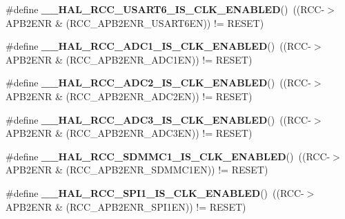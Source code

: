 \begin{DoxyCompactItemize}
\#define {\bfseries \+\_\+\+\_\+\+H\+A\+L\+\_\+\+R\+C\+C\+\_\+\+U\+S\+A\+R\+T6\+\_\+\+I\+S\+\_\+\+C\+L\+K\+\_\+\+E\+N\+A\+B\+L\+ED}()~((R\+CC-\/$>$A\+P\+B2\+E\+NR \& (R\+C\+C\+\_\+\+A\+P\+B2\+E\+N\+R\+\_\+\+U\+S\+A\+R\+T6\+EN)) != R\+E\+S\+ET)
\item 
\mbox{\label{group___r_c_c_ex___peripheral___clock___enable___disable___status_ga66eb89f7d856d9107e814efc751e8996}} 
\#define {\bfseries \+\_\+\+\_\+\+H\+A\+L\+\_\+\+R\+C\+C\+\_\+\+A\+D\+C1\+\_\+\+I\+S\+\_\+\+C\+L\+K\+\_\+\+E\+N\+A\+B\+L\+ED}()~((R\+CC-\/$>$A\+P\+B2\+E\+NR \& (R\+C\+C\+\_\+\+A\+P\+B2\+E\+N\+R\+\_\+\+A\+D\+C1\+EN)) != R\+E\+S\+ET)
\item 
\mbox{\label{group___r_c_c_ex___peripheral___clock___enable___disable___status_ga15b3a60ca51c76fa9da900d5cbcd4234}} 
\#define {\bfseries \+\_\+\+\_\+\+H\+A\+L\+\_\+\+R\+C\+C\+\_\+\+A\+D\+C2\+\_\+\+I\+S\+\_\+\+C\+L\+K\+\_\+\+E\+N\+A\+B\+L\+ED}()~((R\+CC-\/$>$A\+P\+B2\+E\+NR \& (R\+C\+C\+\_\+\+A\+P\+B2\+E\+N\+R\+\_\+\+A\+D\+C2\+EN)) != R\+E\+S\+ET)
\item 
\mbox{\label{group___r_c_c_ex___peripheral___clock___enable___disable___status_ga57679c13a42654a4c1d73fb3ec347d13}} 
\#define {\bfseries \+\_\+\+\_\+\+H\+A\+L\+\_\+\+R\+C\+C\+\_\+\+A\+D\+C3\+\_\+\+I\+S\+\_\+\+C\+L\+K\+\_\+\+E\+N\+A\+B\+L\+ED}()~((R\+CC-\/$>$A\+P\+B2\+E\+NR \& (R\+C\+C\+\_\+\+A\+P\+B2\+E\+N\+R\+\_\+\+A\+D\+C3\+EN)) != R\+E\+S\+ET)
\item 
\mbox{\label{group___r_c_c_ex___peripheral___clock___enable___disable___status_ga146964bf211aad404f4fd87b1a1efd60}} 
\#define {\bfseries \+\_\+\+\_\+\+H\+A\+L\+\_\+\+R\+C\+C\+\_\+\+S\+D\+M\+M\+C1\+\_\+\+I\+S\+\_\+\+C\+L\+K\+\_\+\+E\+N\+A\+B\+L\+ED}()~((R\+CC-\/$>$A\+P\+B2\+E\+NR \& (R\+C\+C\+\_\+\+A\+P\+B2\+E\+N\+R\+\_\+\+S\+D\+M\+M\+C1\+EN)) != R\+E\+S\+ET)
\item 
\mbox{\label{group___r_c_c_ex___peripheral___clock___enable___disable___status_gab1787d7cdf591c099b8d96848aee835e}} 
\#define {\bfseries \+\_\+\+\_\+\+H\+A\+L\+\_\+\+R\+C\+C\+\_\+\+S\+P\+I1\+\_\+\+I\+S\+\_\+\+C\+L\+K\+\_\+\+E\+N\+A\+B\+L\+ED}()~((R\+CC-\/$>$A\+P\+B2\+E\+NR \& (R\+C\+C\+\_\+\+A\+P\+B2\+E\+N\+R\+\_\+\+S\+P\+I1\+EN)) != R\+E\+S\+ET)

\end{DoxyCompactItemize}
